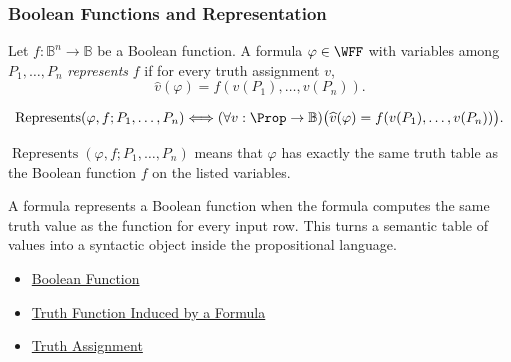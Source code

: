 \subsubsection*{Boolean Functions and Representation}

\begin{tcolorbox}[colback=propbox, colframe=propborder, arc=2pt,
  left=6pt, right=6pt, top=4pt, bottom=4pt,
  title={\small\textbf{Definition (Representation of a Boolean Function)}},
  fonttitle=\small\bfseries]
\begin{definition}
\label{def:boolean-function-representation-propositional-logic}
Let \(f:\mathbb{B}^n\to\mathbb{B}\) be a Boolean function. A formula
\(\varphi\in\WFF\) with variables among \(P_1,\ldots,P_n\) \emph{represents}
\(f\) if for every truth assignment \(v\),
\[
\widehat v(\varphi)=f(v(P_1),\ldots,v(P_n)).
\]
\end{definition}
\end{tcolorbox}

\begin{remark*}
\[
\operatorname{Represents}(\varphi,f;P_1,\ldots,P_n)
\Longleftrightarrow
(\forall v:\Prop\to\mathbb{B})
\bigl(\widehat v(\varphi)=f(v(P_1),\ldots,v(P_n))\bigr).
\]
\end{remark*}

\begin{remark*}
\(\operatorname{Represents}(\varphi,f;P_1,\ldots,P_n)\) means that
\(\varphi\) has exactly the same truth table as the Boolean function \(f\) on
the listed variables.
\end{remark*}

\begin{remark*}[Interpretation]
A formula represents a Boolean function when the formula computes the same
truth value as the function for every input row. This turns a semantic table of
values into a syntactic object inside the propositional language.
\end{remark*}

\begin{dependencies}
\begin{itemize}
  \item \hyperref[def:boolean-function-propositional-logic]{Boolean Function}
  \item \hyperref[def:truth-function-induced-by-formula]{Truth Function Induced by a Formula}
  \item \hyperref[def:truth-assignment-propositional-logic]{Truth Assignment}
\end{itemize}
\end{dependencies}

